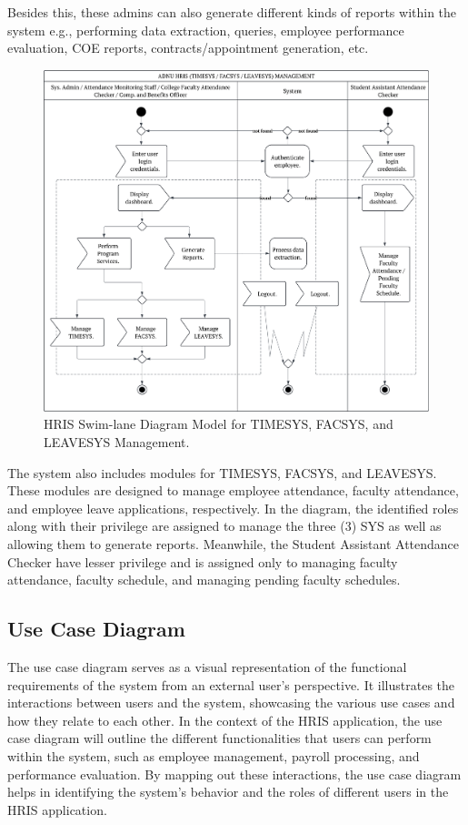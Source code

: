     Besides this, these admins can also generate different kinds of reports within the system e.g., performing data extraction, queries, employee performance evaluation, COE reports, contracts/appointment generation, etc.

    \begin{figure}[H]
        \centering
        \includegraphics[width=1\linewidth]{figures/images/swimlane-sys-mgt.png}
        \caption{HRIS Swim-lane Diagram Model for TIMESYS, FACSYS, and LEAVESYS Management.}
        \label{fig:swimlane-sys-mgt}
    \end{figure}

    The system also includes modules for TIMESYS, FACSYS, and LEAVESYS. These modules are designed to manage employee attendance, faculty attendance, and employee leave applications, respectively. In the diagram, the identified roles along with their privilege are assigned to manage the three (3) SYS as well as allowing them to generate reports. Meanwhile, the Student Assistant Attendance Checker have lesser privilege and is assigned only to managing faculty attendance, faculty schedule, and managing pending faculty schedules.

    \subsection{Use Case Diagram}
    
    The use case diagram serves as a visual representation of the functional requirements of the system from an external user's perspective. It illustrates the interactions between users and the system, showcasing the various use cases and how they relate to each other. In the context of the HRIS application, the use case diagram will outline the different functionalities that users can perform within the system, such as employee management, payroll processing, and performance evaluation. By mapping out these interactions, the use case diagram helps in identifying the system's behavior and the roles of different users in the HRIS application.

